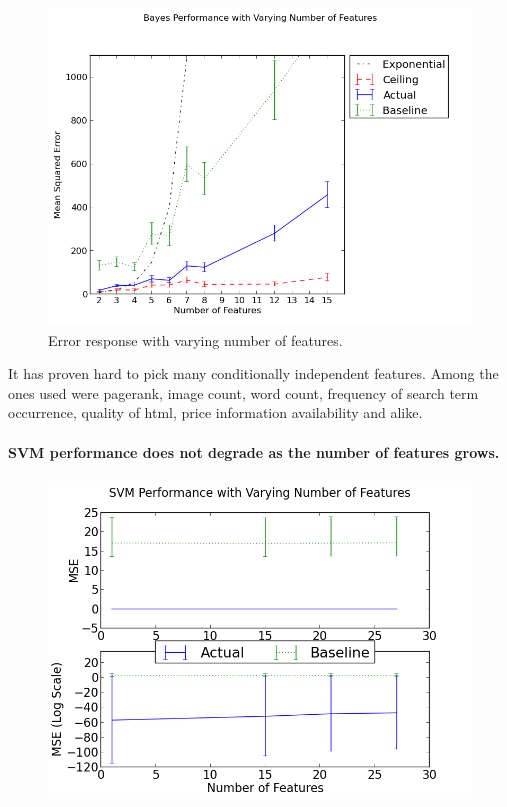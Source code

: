 \documentclass[12pt,notitlepage,twoside]{scrreprt}
\begin{document}
\begin{figure}[h!]
  \centering
  \includegraphics[width=\linewidth]{figs/feats.png}
  \caption{Error response with varying number of features.\label{feats}}
\end{figure}

It has proven hard to pick many conditionally independent features. Among the ones used
were pagerank, image count, word count, frequency of search term occurrence, quality of
html, price information availability and alike.

\paragraph{SVM performance does not degrade as the number of features grows.}


\begin{figure}[h!]
\centering
  \includegraphics[width=\linewidth]{figs/svm_feats.png}
  \caption{}
  \label{def}
\end{figure}
\end{document}
